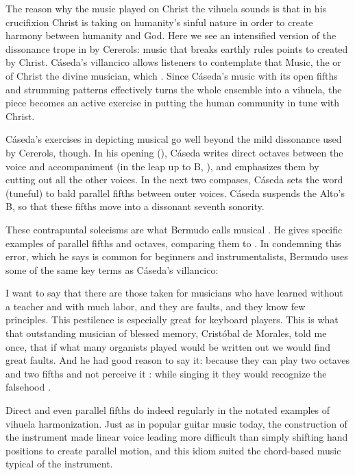 The reason why the music played on Christ the vihuela sounds  is
that in his crucifixion Christ is taking on humanity's sinful nature in order
to create harmony between humanity and God.
Here we see an intensified version of the dissonance trope in
 by Cererols: music that breaks earthly rules points
to  created by Christ.
Cáseda's villancico allows listeners to contemplate that Music, the
 or  of Christ the divine
musician, which .
Since Cáseda's music with its open fifths and strumming patterns effectively
turns the whole ensemble into a vihuela, the piece becomes an active exercise
in putting the human community in tune with Christ.

Cáseda's exercises in depicting musical  go well beyond the
mild dissonance used by Cererols, though.
In his opening (), Cáseda writes
direct octaves between the voice and accompaniment (in the leap up to B\fl,
), and emphasizes them by cutting out all the other voices.
In the next two compases, Cáseda sets the word  (tuneful) to
bald parallel fifths between outer voices.
Cáseda suspends the Alto's B\fl, so that these fifths move into a dissonant
seventh sonority.

These contrapuntal solecisms are what Bermudo calls musical .
He gives specific examples of parallel fifths and octaves, comparing them to
.
In condemning this error, which he says is common for beginners and
instrumentalists, Bermudo uses some of the same key terms as Cáseda's
villancico:
\begin{quoting}
    I want to say that there are those taken for musicians who have learned
    without a teacher and with much labor, and they are faults, and they know
    few principles.
    This pestilence is especially great for keyboard players.  
    This is what that outstanding musician of blessed memory, Cristóbal de
    Morales, told me once, that if what many organists played would be written
    out we would find great faults.  
    And he had good reason to say it: because they can play two octaves and two
    fifths and not perceive it : while
    singing it they would recognize the falsehood .%
        \Autocite[]{Bermudo:Declaracion} 
\end{quoting}
Direct and even parallel fifths do indeed regularly in the notated examples of
vihuela harmonization.%
    \Autocite{Araujo-Mendonca:Vihuela}
Just as in popular guitar music today, the construction of the instrument made
linear voice leading more difficult than simply shifting hand positions to
create parallel motion, and this idiom suited the chord-based music typical of
the instrument.

